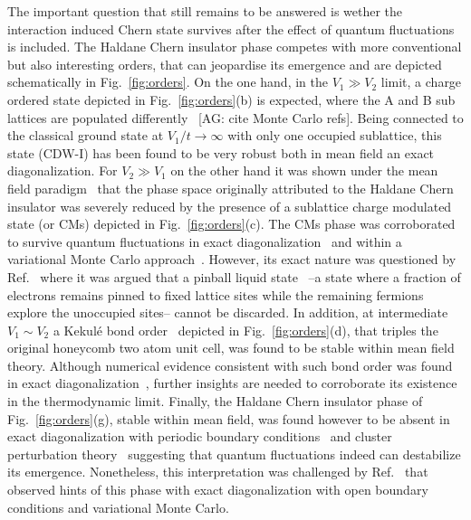 \documentclass[aps,prx,10pt,twocolumn,floatfix,superscriptaddress,showpacs,numerical,footinbib]{revtex4-1}
\newcommand{\noteAG}[1]{{\color{blue} [AG: #1]}}
\begin{document}
The important question that still remains to be answered is wether the interaction induced Chern state survives 
after the effect of quantum fluctuations is included.
%
The Haldane Chern insulator phase competes with more conventional but also interesting orders, 
that can jeopardise its emergence and are depicted schematically in Fig.~\ref{fig:orders}.
%
On the one hand, in the $V_{1} \gg V_{2}$ limit, a charge ordered state depicted in Fig.~\ref{fig:orders}(b) is expected, 
where the A and B sub lattices are populated differently~\cite{RQHZ08,WCT14} \noteAG{cite Monte Carlo refs}.
%
Being connected to the classical ground state at $V_{1}/t \to \infty$ with only one occupied sublattice, this state (CDW-I) has been found to be very robust both in mean field an exact diagonalization.
%
For $V_{2}\gg V_{1}$ on the other hand it was shown under the mean field paradigm~\cite{GCC13} that the phase space originally attributed to the Haldane Chern insulator 
was severely reduced by the presence of a sublattice charge modulated state (or CMs) depicted in Fig.~\ref{fig:orders}(c).
%
The CMs phase was corroborated to survive quantum fluctuations in exact diagonalization~\cite{GGNVC13,DCH14} and within a variational Monte Carlo approach~\cite{DCH14}.
%
However, its exact nature was questioned by Ref.~\cite{DH14} where it was argued that a pinball liquid state~\cite{HF06,MRF13} --a state where a fraction of electrons remains pinned to fixed lattice sites while the remaining fermions explore the unoccupied sites-- cannot be discarded. 
%
In addition, at intermediate $V_{1}\sim V_{2}$ a Kekul\'e bond order~\cite{C00,HCM07,WF10,RH10,RJH13} depicted in Fig.~\ref{fig:orders}(d), that triples the original honeycomb two atom unit cell, 
was found to be stable within mean field theory.
%
Although numerical evidence consistent with such bond order was found in exact diagonalization~\cite{GGNVC13}, further insights are needed to corroborate its existence in the thermodynamic limit.
%
Finally, the Haldane Chern insulator phase of Fig.~\ref{fig:orders}(g), stable within mean field, was found however to be absent in exact diagonalization with periodic boundary conditions~\cite{GGNVC13,DH14} and cluster perturbation theory~\cite{DH14} suggesting that quantum fluctuations indeed can destabilize its emergence.
%
Nonetheless, this interpretation was challenged by Ref.~\cite{DCH14} that observed hints of this phase with exact diagonalization with open boundary conditions and variational Monte Carlo.\\
\end{document}
